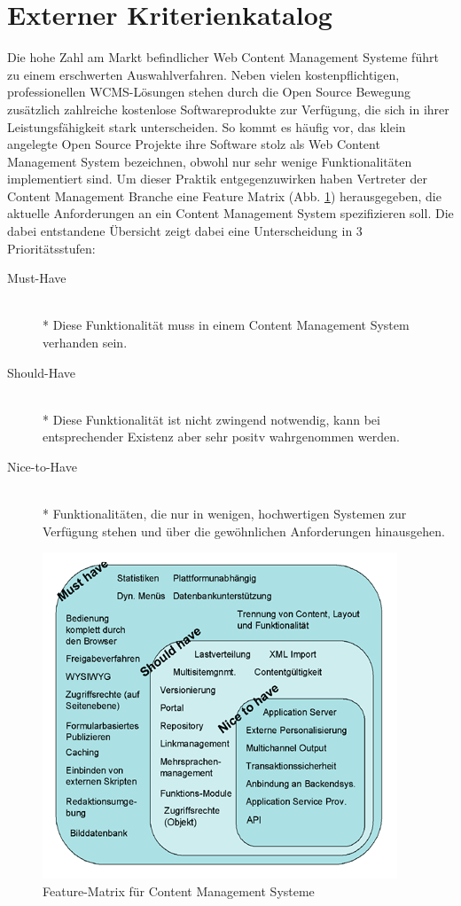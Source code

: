 \newpage

\section{Externer Kriterienkatalog}
Die hohe Zahl am Markt befindlicher Web Content Management Systeme führt zu einem erschwerten Auswahlverfahren. Neben vielen kostenpflichtigen, professionellen WCMS-Lösungen stehen durch die Open Source Bewegung zusätzlich zahlreiche kostenlose Softwareprodukte zur Verfügung, die sich in ihrer Leistungsfähigkeit stark unterscheiden.
So kommt es häufig vor, das klein angelegte Open Source Projekte ihre Software stolz als Web Content Management System bezeichnen, obwohl nur sehr wenige Funktionalitäten implementiert sind.
Um dieser Praktik entgegenzuwirken haben Vertreter der Content Management Branche eine Feature Matrix (Abb. \ref{featurematrix}) herausgegeben, die aktuelle Anforderungen an ein Content Management System spezifizieren soll. Die dabei entstandene Übersicht zeigt dabei eine Unterscheidung in 3 Prioritätsstufen:

\begin{description}
\item[Must-Have]\mbox{~}\\*
Diese Funktionalität muss in einem Content Management System verhanden sein.
\item[Should-Have]\mbox{~}\\*
Diese Funktionalität ist nicht zwingend notwendig, kann bei entsprechender Existenz aber sehr positv wahrgenommen werden.
\item[Nice-to-Have]\mbox{~}\\*
Funktionalitäten, die nur in wenigen, hochwertigen Systemen zur Verfügung stehen und über die gewöhnlichen Anforderungen hinausgehen.
\end{description}


\begin{figure}[!h]
\begin{center}
\includegraphics[scale=0.3]{images/analyse/wcmfeaturematrix.png}
\caption{Feature-Matrix für Content Management Systeme}
\label{featurematrix}
\end{center}
\end{figure}


